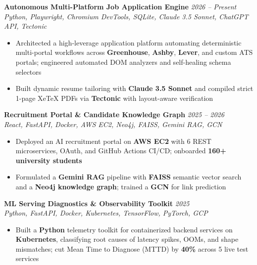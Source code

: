 \documentclass[10pt]{article}
\begin{document}
\textbf{Autonomous Multi-Platform Job Application Engine} \hfill \href{https://github.com/username/project}{\faGithub} \textcolor{subheadingcolor}{\textit{2026 -- Present}} \\
\textit{Python, Playwright, Chromium DevTools, SQLite, Claude 3.5 Sonnet, ChatGPT API, Tectonic}
\begin{itemize}
    \item Architected a high-leverage application platform automating deterministic multi-portal workflows across \textbf{Greenhouse}, \textbf{Ashby}, \textbf{Lever}, and custom ATS portals; engineered automated DOM analyzers and self-healing schema selectors
    \item Built dynamic resume tailoring with \textbf{Claude 3.5 Sonnet} and compiled strict 1-page XeTeX PDFs via \textbf{Tectonic} with layout-aware verification
\end{itemize}
\vspace{-0.25em}

\textbf{Recruitment Portal \& Candidate Knowledge Graph} \hfill \href{https://github.com/username/portal}{\faGithub} \textcolor{subheadingcolor}{\textit{2025 -- 2026}} \\
\textit{React, FastAPI, Docker, AWS EC2, Neo4j, FAISS, Gemini RAG, GCN}
\begin{itemize}
    \item Deployed an AI recruitment portal on \textbf{AWS EC2} with 6 REST microservices, OAuth, and GitHub Actions CI/CD; onboarded \textbf{160+ university students}
    \item Formulated a \textbf{Gemini RAG} pipeline with \textbf{FAISS} semantic vector search and a \textbf{Neo4j knowledge graph}; trained a \textbf{GCN} for link prediction
\end{itemize}
\vspace{-0.25em}

\textbf{ML Serving Diagnostics \& Observability Toolkit} \hfill \href{https://github.com/username/ml-monitoring}{\faGithub} \textcolor{subheadingcolor}{\textit{2025}} \\
\textit{Python, FastAPI, Docker, Kubernetes, TensorFlow, PyTorch, GCP}
\begin{itemize}
    \item Built a \textbf{Python} telemetry toolkit for containerized backend services on \textbf{Kubernetes}, classifying root causes of latency spikes, OOMs, and shape mismatches; cut Mean Time to Diagnose (MTTD) by \textbf{40\%} across 5 live test services
\end{itemize}
\vspace{-0.45em}
\end{document}
